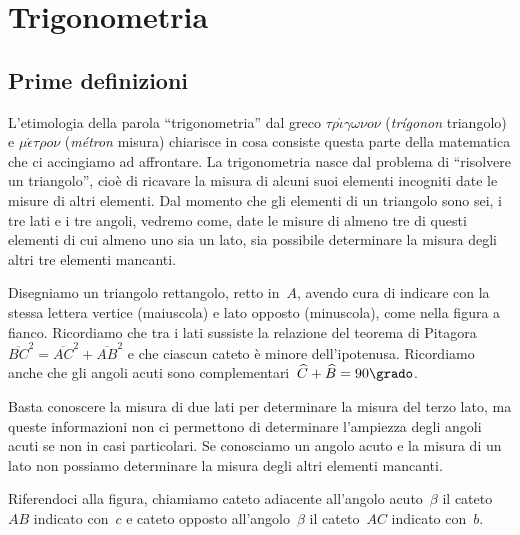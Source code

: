 
\chapter{Trigonometria}

\section{Prime definizioni}

L'etimologia della parola ``trigonometria'' dal greco $\tau\rho\acute{\iota}\gamma\omega\nu o\nu$ (\emph{trígonon} triangolo) e $\mu\acute{\epsilon}\tau\rho o\nu$ (\emph{métron} misura) chiarisce in cosa consiste
questa parte della matematica che ci accingiamo ad affrontare.
La trigonometria nasce dal problema di ``risolvere un triangolo'', cioè di ricavare la misura di alcuni suoi elementi incogniti date
le misure di altri elementi. Dal momento che gli elementi di un triangolo sono sei, i tre lati e i tre angoli, vedremo come, date le misure di
almeno tre di questi elementi di cui almeno uno sia un lato, sia possibile determinare la misura degli altri tre elementi mancanti.
\begin{multicols}{2}
 Disegniamo un triangolo rettangolo, retto in~$A$, avendo cura di indicare con la stessa lettera vertice (maiuscola) e lato opposto (minuscola), come nella figura a fianco.
Ricordiamo che tra i lati sussiste la relazione del teorema di Pitagora~$\overline{BC}^{2}=\overline{AC}^{2}+\overline{AB}^{2}$ e che ciascun cateto
è minore dell'ipotenusa. Ricordiamo anche che gli angoli acuti sono complementari~$\widehat {C}+\widehat {B}=90\grado$.
\begin{center}\label{fig:triangolo_rettangolo}
 
\end{center}
\end{multicols}
\osservazione Basta conoscere la misura di due lati per determinare la misura del terzo lato, ma queste informazioni non ci permettono di determinare
l'ampiezza degli angoli acuti se non in casi particolari. Se conosciamo un angolo acuto e la misura di un lato non possiamo determinare la misura
degli altri elementi mancanti.

Riferendoci alla figura, chiamiamo cateto adiacente all'angolo acuto~$\beta$ il cateto~${AB}$ indicato con~$c$ e cateto opposto all'angolo~$\beta$ il
cateto~${AC}$ indicato con~$b$.

